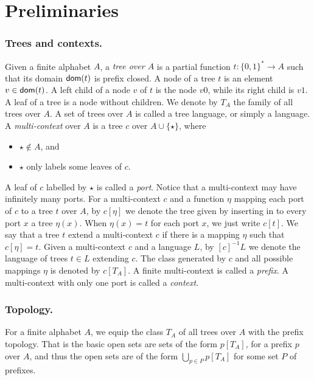 \section{Preliminaries}
\subsubsection*{Trees and contexts.}
Given a finite alphabet $A$, a \emph{tree over $A$} is a partial function $t: \{0,1\}^* \to A$ such that its domain $\mathsf{dom}(t)$ is prefix closed. A node of a tree $t$ is an element $v \in \mathsf{dom}(t)$. A left child of a node $v$ of $t$ is the node $v0$, while its right child is $v1$. A leaf of a tree is a node without children. %
We denote by $T_A$ the family of all  trees over $A$.
A set of trees over $A$ is called a tree language, or simply a language.
A \emph{multi-context} over $A$ is a tree $c$ over $A \cup \{\star\}$, where 
\begin{itemize} 
\item $\star \notin A$, and 
\item $\star$ only labels some leaves of $c$. 
\end{itemize}
A leaf of $c$ labelled by $\star$ is called a \emph{port}. Notice that a multi-context may have infinitely many ports. For a multi-context $c$ and a function $\eta$ mapping each port of $c$ to a tree $t$ over $A$, by $c[\eta]$ we denote the tree given by inserting in to every port $x$ a tree $\eta(x)$. When $\eta(x)=t$ for each port $x$, we just write $c[t]$.  We say that a tree $t$ extend a multi-context $c$ if there is a mapping $\eta$ such that $c[\eta]=t$. Given a multi-context $c$ and a language $L$, by $[c]^{-1}L$ we denote the language of trees $t\in L$ extending $c$.
 The class generated by $c$ and all possible mappings $\eta$ is denoted by $c[T_A]$. %
A finite multi-context is called a \emph{prefix}.
A multi-context with only one port is called a \emph{context}. %
\subsubsection*{Topology.}
For a finite alphabet $A$, we equip the class $T_A$ of all trees over $A$ with the prefix topology. That is the basic open sets are sets of the form $p[T_A]$, for a prefix $p$ over $A$, and thus the open sets are of the form $\bigcup_{p \in P}p[T_A]$ for some set $P$ of prefixes. 

